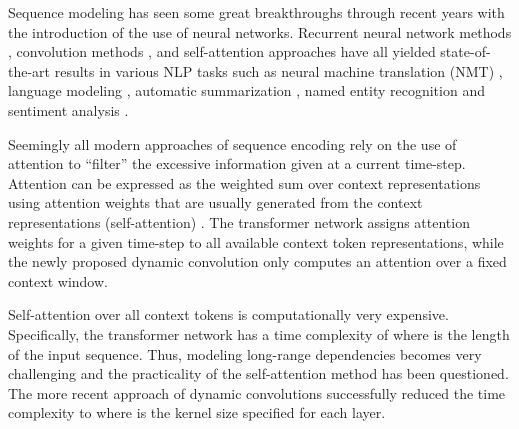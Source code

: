 \documentclass{article}
\begin{document}
Sequence modeling has seen some great breakthroughs through recent years with the introduction of the use of neural networks. Recurrent neural network methods \cite{DBLP:journals/corr/SutskeverVL14,bahdanau2014neural,DBLP:journals/corr/WuSCLNMKCGMKSJL16}, convolution methods \cite{kim-2014-convolutional,kalchbrenner-etal-2014-convolutional,DBLP:journals/corr/KalchbrennerESO16,gehring2017convolutional,wu2019pay}, and self-attention approaches \cite{DBLP:journals/corr/PaulusXS17,vaswani2017attention,DBLP:journals/corr/abs-1901-02860, kitaev2020reformer} have all yielded state-of-the-art results in various NLP tasks such as neural machine translation (NMT) \cite{DBLP:journals/corr/SutskeverVL14,DBLP:journals/corr/WuSCLNMKCGMKSJL16,DBLP:journals/corr/BritzGLL17,DBLP:journals/corr/abs-1903-00089}, language modeling \cite{Sundermeyer2012,DBLP:journals/corr/TranBM16,DBLP:journals/corr/abs-1810-04805,radford2019language}, automatic summarization \cite{DBLP:journals/corr/PaulusXS17,DBLP:journals/corr/abs-1711-05217,DBLP:journals/corr/abs-1803-10357}, named entity recognition \cite{DBLP:journals/corr/LampleBSKD16,DBLP:journals/corr/abs-1810-04805} and  sentiment analysis \cite{DBLP:journals/corr/XuCQH16,Sachan2019RevisitingLN}.

Seemingly all modern approaches of sequence encoding rely on the use of attention to ``filter'' the excessive information given at a current time-step. Attention can be expressed as the weighted sum over context representations using attention weights that are usually generated from the context representations (self-attention) \cite{Cheng_2016}. The transformer network \cite{vaswani2017attention} assigns attention weights for a given time-step to all available context token representations, while the newly proposed dynamic convolution \cite{wu2019pay} only computes an attention over a fixed context window. 

Self-attention over all context tokens is computationally very expensive. Specifically, the transformer network has a time complexity of  where  is the length of the input sequence. Thus, modeling long-range dependencies becomes very challenging and the practicality of the self-attention method has been questioned.
The more recent approach of dynamic convolutions \cite{wu2019pay} successfully reduced the time complexity to  where  is 
the kernel size specified for each layer.
\end{document}
